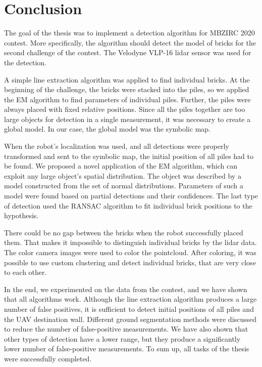 \chapter{Conclusion}
\label{ch:conclusion}
The goal of the thesis was to implement a detection algorithm for MBZIRC 2020 contest. More specifically, the algorithm should detect the model of bricks for the second challenge of the contest. The Velodyne VLP-16 lidar sensor was used for the detection. 

A simple line extraction algorithm was applied to find individual bricks. At the beginning of the challenge, the bricks were stacked into the piles, so we applied the EM algorithm to find parameters of individual piles. Further, the piles were always placed with fixed relative positions. Since all the piles together are too large objects for detection in a single measurement, it was necessary to create a global model. In our case, the global model was the symbolic map.

When the robot's localization was used, and all detections were properly transformed and sent to the symbolic map, the initial position of all piles had to be found. We proposed a novel application of the EM algorithm, which can exploit any large object’s spatial distribution. The object was described by a model constructed from the set of normal distributions. Parameters of such a model were found based on partial detections and their confidences. The last type of detection used the RANSAC algorithm to fit individual brick positions to the hypothesis.

There could be no gap between the bricks when the robot successfully placed them. That makes it impossible to distinguish individual bricks by the lidar data. The color camera images were used to color the pointcloud. After coloring, it was possible to use custom clustering and detect individual bricks, that are very close to each other.

In the end, we experimented on the data from the contest, and we have shown that all algorithms work. Although the line extraction algorithm produces a large number of false positives, it is sufficient to detect initial positions of all piles and the UAV destination wall. Different ground segmentation methods were discussed to reduce the number of false-positive measurements. We have also shown that other types of detection have a lower range, but they produce a significantly lower number of false-positive measurements. To sum up, all tasks of the thesis were successfully completed.